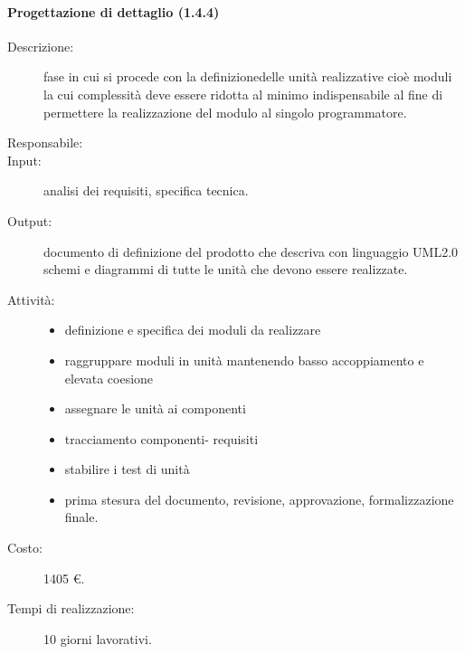 \paragraph{Progettazione di dettaglio (1.4.4)}
\begin{description}
\item[Descrizione:] fase in cui si procede con la definizionedelle unit\`{a} realizzative cio\`{e} moduli la cui complessit\`{a} deve essere ridotta al minimo indispensabile al fine di permettere la realizzazione del modulo al singolo programmatore.
\item[Responsabile:] 
\item[Input:] analisi dei requisiti, specifica tecnica.
\item[Output:] documento di definizione del prodotto che descriva con linguaggio UML2.0 schemi e diagrammi di tutte le unit\`{a} che devono essere realizzate.
\item[Attivit\`{a}:] 
\begin{center}
\begin{itemize}
\item definizione e specifica dei moduli da realizzare
\item raggruppare moduli in unit\`{a} mantenendo basso accoppiamento e elevata coesione
\item assegnare le unit\`{a} ai componenti
\item tracciamento componenti- requisiti
\item stabilire i test di unit\`{a}
\item prima stesura del documento, revisione, approvazione, formalizzazione finale.
\end{itemize}
\end{center}
\item[Costo:] 1405 \euro{}.
\item[Tempi di realizzazione:] 10 giorni lavorativi.
\end{description}

